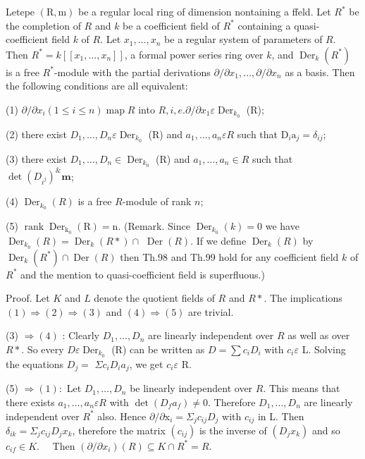 Letepe $(\mathrm{R}, \mathrm{m})$ be a regular local ring of dimension nontaining a ffeld. Let $R^{*}$ be the completion of $R$ and $k$ be a coefficient field of $R^{*}$ containing a quasi-coefficient field $k$ of $R$. Let $x_{1}, \ldots, x_{n}$ be a regular system of parameters of $R$. Then $R^{*}=k\left[\left[x_{1}, \ldots, x_{n}\right]\right]$, a formal power series ring over $k$, and $\operatorname{Der}_{k}\left(R^{*}\right)$ is a free $R^{*}$-module with the partial derivations $\partial / \partial x_{1}, \ldots, \partial / \partial x_{n}$ as a basis. Then the following conditions are all equivalent:

(1) $\partial / \partial x_{i}(1 \leqslant i \leqslant n) \operatorname{map} R$ into $R, i, e . \partial / \partial x_{1} \varepsilon \operatorname{Der}_{k_{0}}$ (R);

(2) there exist $D_{1}, \ldots, D_{n} \varepsilon \operatorname{Der}_{k_{0}}$ (R) and $a_{1}, \ldots, a_{n} \varepsilon R$ such that $\mathrm{D}_{i} \mathrm{a}_{j}=\delta_{i j}$;

(3) there exist $D_{1}, \ldots, D_{n} \in \operatorname{Der}_{k_{0}}$ (R) and $a_{1}, \ldots, a_{n} \in R$ such that $\operatorname{det}\left(D_{i^{j}}\right)^{\&} \boldsymbol{m}$;

(4) $\operatorname{Der}_{k_{0}}(R)$ is a free $R$-module of rank $n$;

(5) $\operatorname{rank} \operatorname{Der}_{\mathrm{k}_{0}}(\mathrm{R})=\mathrm{n}$. (Remark. Since $\operatorname{Der}_{k_{0}}(k)=0$ we have $\operatorname{Der}_{k_{0}}(R)=\operatorname{Der}_{k}(R *) \cap$ $\operatorname{Der}(R)$. If we define $\operatorname{Der}_{k}(R)$ by $\operatorname{Der}_{k}\left(R^{*}\right) \cap \operatorname{Der}(R)$ then Th.98 and Th.99 hold for any coefficient field $k$ of $R^{*}$ and the mention to quasi-coefficient field is superfluous.)

Proof. Let $K$ and $L$ denote the quotient fields of $R$ and $R *$. The implications $(1) \Rightarrow(2) \Rightarrow(3)$ and $(4) \Rightarrow(5)$ are trivial.

(3) $\Rightarrow(4)$ : Clearly $D_{1}, \ldots, D_{n}$ are linearly independent over $R$ as well as over $R *$. So every $D \varepsilon \operatorname{Der}_{k_{0}}$ (R) can be written as $D=\sum c_{i} D_{i}$ with $c_{i} \varepsilon$ L. Solving the equations $D_{j}=$ $\Sigma c_{i} D_{i} a_{j}$, we get $c_{i} \varepsilon$ R.

(5) $\Rightarrow(1):$ Let $D_{1}, \ldots, D_{n}$ be linearly independent over $R$. This means that there exists $a_{1}, \ldots, a_{n} \varepsilon R$ with $\operatorname{det}\left(D_{f} a_{f}\right) \neq 0$. Therefore $D_{1}, \ldots, D_{n}$ are linearly independent over $R^{*}$ also. Hence $\partial / \partial \mathrm{x}_{i}=\Sigma_{j} c_{i j} D_{j}$ with $c_{i j}$ in L. Then $\delta_{i k}=\Sigma_{j} c_{i j} D_{j} x_{k}$, therefore the matrix $\left(c_{i j}\right)$ is the inverse of $\left(D_{j} x_{k}\right)$ and so $c_{i f} \in K . \quad$ Then $\left(\partial / \partial x_{i}\right)(R) \subseteq K \cap R^{*}=R .$

